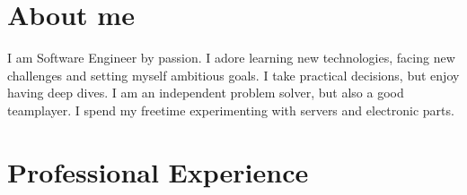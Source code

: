 \documentclass[11pt]{article}
\begin{document}
\begin{minipage}[t]{0.65\textwidth}

  \section*{About me}
  I am Software Engineer by passion. I adore learning new technologies, facing 
  new challenges and setting myself ambitious goals. I take practical 
  decisions, but enjoy having deep dives. I am an independent problem solver, 
  but also a good teamplayer. I spend my freetime experimenting with servers and electronic parts.

  \section*{Professional Experience}
  \newcommand{\job}[5]{
    \multirow{2}{*}{\shortstack[r]{\small#3\\ \small#4}} & \normalsize\textbf{#1}, \textit{#2} \\
    &\begin{compactitem}
      #5
    \end{compactitem} \\
  }


\end{minipage}
\end{document}
